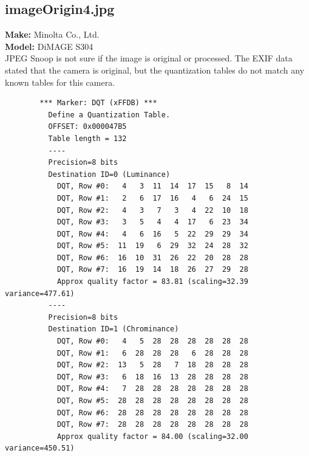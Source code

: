 \documentclass{article}
\begin{document}
\subsection{imageOrigin4.jpg}
	\textbf{Make:} Minolta Co., Ltd.\\
	\textbf{Model:} DiMAGE S304\\
JPEG Snoop is not sure if the image is original or processed.
The EXIF data stated that the camera is original, but the
quantization tables do not match any known tables for this camera.
\begin{lstlisting}
		*** Marker: DQT (xFFDB) ***
		  Define a Quantization Table.
		  OFFSET: 0x000047B5
		  Table length = 132
		  ----
		  Precision=8 bits
		  Destination ID=0 (Luminance)
			DQT, Row #0:   4   3  11  14  17  15   8  14 
			DQT, Row #1:   2   6  17  16   4   6  24  15 
			DQT, Row #2:   4   3   7   3   4  22  10  18 
			DQT, Row #3:   3   5   4   4  17   6  23  34 
			DQT, Row #4:   4   6  16   5  22  29  29  34 
			DQT, Row #5:  11  19   6  29  32  24  28  32 
			DQT, Row #6:  16  10  31  26  22  20  28  28 
			DQT, Row #7:  16  19  14  18  26  27  29  28 
			Approx quality factor = 83.81 (scaling=32.39 variance=477.61)
		  ----
		  Precision=8 bits
		  Destination ID=1 (Chrominance)
			DQT, Row #0:   4   5  28  28  28  28  28  28 
			DQT, Row #1:   6  28  28  28   6  28  28  28 
			DQT, Row #2:  13   5  28   7  18  28  28  28 
			DQT, Row #3:   6  18  16  13  28  28  28  28 
			DQT, Row #4:   7  28  28  28  28  28  28  28 
			DQT, Row #5:  28  28  28  28  28  28  28  28 
			DQT, Row #6:  28  28  28  28  28  28  28  28 
			DQT, Row #7:  28  28  28  28  28  28  28  28 
			Approx quality factor = 84.00 (scaling=32.00 variance=450.51)
\end{lstlisting}
\end{document}

